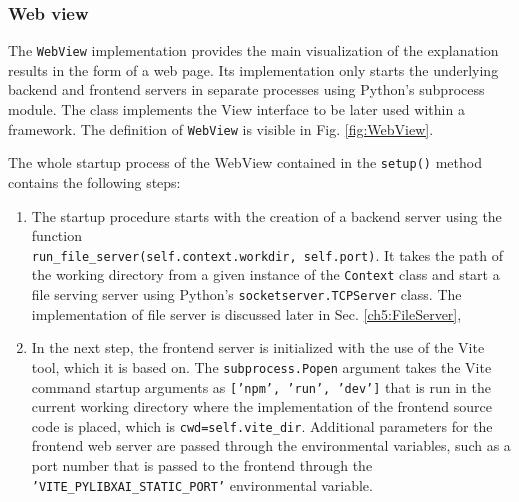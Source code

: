 \documentclass[
    bindingoffset=5mm,  %
    footnoteindent=3mm, %
    hyphenation=true    %
]{src/wut-thesis}
\begin{document}
\subsubsection{Web view}

The \texttt{WebView} implementation provides the main visualization of the explanation results
in the form of a web page. Its implementation only starts the underlying backend and frontend servers
in separate processes using Python's subprocess module.  The class implements the View interface to be later used within a framework. The definition of \texttt{WebView} is visible in Fig. \ref{fig:WebView}.

The whole startup process of the WebView contained in the \texttt{setup()} method contains the following steps:
\begin{enumerate}
    \item The startup procedure starts with the creation of a backend server using the function  \\
        \texttt{run_file_server(self.context.workdir, self.port)}.
        It takes the path of \\ the working directory from a given instance of the \texttt{Context} class
        and start a file serving server using Python's \texttt{socketserver.TCPServer} class.
        The implementation of file server is discussed later in Sec. \ref{ch5:FileServer},
    \item In the next step, the frontend server is initialized with the use of the Vite \cite{ViteDOC} tool,
        which it is based on. The \texttt{subprocess.Popen} argument takes the
        Vite command startup arguments as \texttt{['npm', 'run', 'dev']} that is run in the current working directory where the implementation of the frontend source code is placed, which is \texttt{cwd=self.vite_dir}. Additional parameters for the frontend web server are passed through the environmental variables, such as a port number that is passed to the frontend through the \texttt{'VITE_PYLIBXAI_STATIC_PORT'} environmental variable.
    
\end{enumerate}
\end{document}
